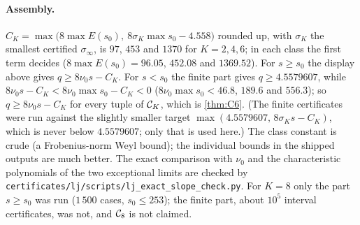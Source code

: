 \paragraph{Assembly.}
$C_K=\max\bigl(8\max E(s_0),\ 8\sigma_K\max s_0-4.558\bigr)$ rounded up, with $\sigma_K$ the
smallest certified $\sigma_\infty$, is $97$, $453$ and $1370$ for $K=2,4,6$; in each class the
first term decides ($8\max E(s_0)=96.05$, $452.08$ and $1369.52$). For $s\ge s_0$ the display
above gives $q\ge8\nu_0s-C_K$. For $s<s_0$ the finite part gives $q\ge4.5579607$, while
$8\nu_0s-C_K<8\nu_0\max s_0-C_K<0$ ($8\nu_0\max s_0<46.8$, $189.6$ and $556.3$); so
$q\ge8\nu_0s-C_K$ for every tuple of $\mathcal{C}_K$, which is \cref{thm:C6}. (The finite certificates
were run against the slightly smaller target $\max(4.5579607,\,8\sigma_Ks-C_K)$, which is
never below $4.5579607$; only that is used here.) The class constant is crude (a
Frobenius-norm Weyl bound); the individual bounds in the shipped outputs are much better.
The exact comparison with $\nu_0$ and the characteristic polynomials of the two exceptional
limits are checked by \texttt{certificates/lj/scripts/lj\_exact\_slope\_check.py}. For $K=8$ only the part $s\ge s_0$
was run ($1\,500$ cases, $s_0\le253$); the finite part, about $10^5$ interval certificates,
was not, and $\mathcal{C}_8$ is not claimed.
